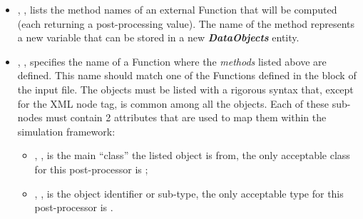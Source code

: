 \begin{itemize}
  \item {}, ,
  lists the method names of an external Function that will be computed (each
  returning a post-processing value). The name of the method represents a new
  variable that can be stored in a new \textbf{\textit{DataObjects}} entity.
  \item {}, , specifies
  the name of a Function where the \textit{methods} listed above are defined.
  \nb This name should match one of the Functions defined in the
   block of the input file.
  The objects must be listed with a rigorous syntax that, except for the XML
  node tag, is common among all the objects.
  Each of these sub-nodes must contain 2 attributes that are used to map them
  within the simulation framework:

   \begin{itemize}
     \item {}, , is the main
     ``class'' the listed object is from, the only acceptable class for
     this post-processor is ;
     \item {}, , is the object
     identifier or sub-type, the only acceptable type for this post-processor is
     .
  \end{itemize}
\end{itemize}

